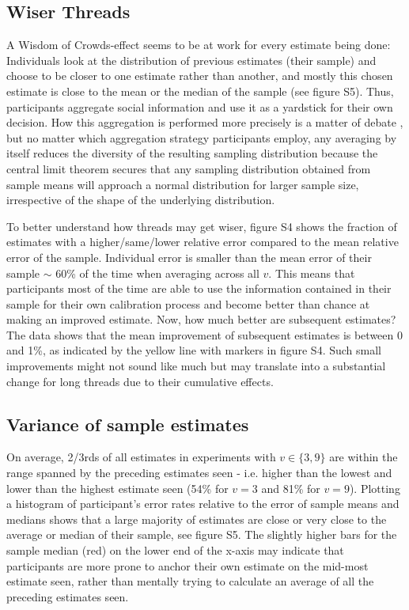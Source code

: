 \documentclass[9pt,twoside,lineno]{pnas-new}
\begin{document}
\subsection*{Wiser Threads}
A Wisdom of Crowds-effect seems to be at work for every estimate being done: Individuals look at the distribution of previous estimates (their sample) and choose to be closer to one estimate rather than another, and mostly this chosen estimate is close to the mean or the median of the sample (see figure S5). Thus, participants aggregate social information and use it as a yardstick for their own decision. How this aggregation is performed more precisely is a matter of debate \cite{rader2017advice}, but no matter which aggregation strategy participants employ, any averaging by itself reduces the diversity of the resulting sampling distribution because the central limit theorem secures that any sampling distribution obtained from sample means will approach a normal distribution for larger sample size, irrespective of the shape of the underlying distribution.

To better understand how threads may get wiser, figure S4 shows the fraction of estimates with a higher/same/lower relative error compared to the mean relative error of the sample. Individual error is smaller than the mean error of their sample $\sim$ 60\% of the time when averaging across all $v$. This means that participants most of the time are able to use the information contained in their sample for their own calibration process and become better than chance at making an improved estimate. Now, how much better are subsequent estimates? The data shows that the mean improvement of subsequent estimates is between 0 and 1\%, as indicated by the yellow line with markers in figure S4.  Such small improvements might not sound like much but may translate into a substantial change for long threads due to their cumulative effects.

\subsection*{Variance of sample estimates}
On average, 2/3rds of all estimates in experiments with $v \in \{3,9\}$ are within the range spanned by the preceding estimates seen - i.e. higher than the lowest and lower than the highest estimate seen (54\% for $v=3$ and 81\% for $v=9$). Plotting a histogram of participant's error rates relative to the error of sample means and medians shows that a large majority of estimates are close or very close to the average or median of their sample, see figure S5. The slightly higher bars for the sample median (red) on the lower end of the x-axis may indicate that participants are more prone to anchor their own estimate on the mid-most estimate seen, rather than mentally trying to calculate an average of all the preceding estimates seen.
\end{document}
